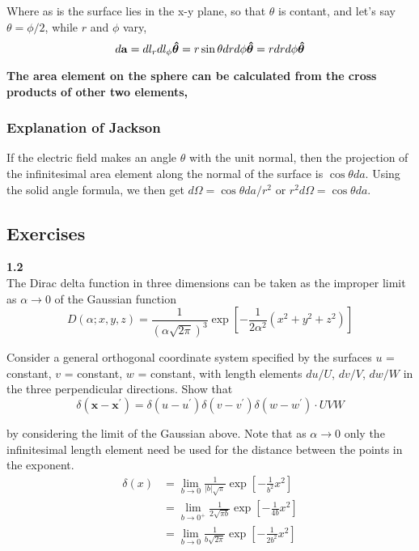 Where as is the surface lies in the x-y plane, so that $\theta$ is contant, and let's say $\theta = \phi/2$,
while $r$ and $\phi$ vary,
$$
d\boldsymbol{\mathbf{a}} = dl_r dl_\phi \boldsymbol{\mathbf{\hat{\theta}}}
= r \sin\theta dr d\phi \boldsymbol{\mathbf{\hat{\theta}}}
= r dr d\phi \boldsymbol{\mathbf{\hat{\theta}}}
$$

\textbf{The area element on the sphere can be calculated from the cross products of other two elements,}


\subsubsection{Explanation of Jackson}

If the electric field makes an angle $\theta$ with the unit normal, then the projection of the
infinitesimal area element along the normal of the surface is $\cos\theta da$.
Using the solid angle formula, we then get $d\Omega = \cos\theta da / r^2$ or
$r^2 d\Omega = \cos\theta da$.



\subsection{Exercises}

\textbf{1.2}
\\

The Dirac delta function in three dimensions can be taken as the improper limit as $\alpha \rightarrow 0$ of the
Gaussian function
$$
D\left(\alpha ; x, y, z \right) =
    \frac{1}{\left(\alpha \sqrt{2\pi}\right)^3}
    \exp{ \left[ -\frac{1}{2\alpha^2} \left( x^2 + y^2 + z^2 \right) \right] }
$$

Consider a general orthogonal coordinate system specified by the surfaces $u$ = constant, $v$ = constant,
$w$ = constant, with length elements $du/U$, $dv/V$, $dw/W$ in the three perpendicular directions.
Show that
$$
\delta\left( \mathbf{x} - \mathbf{x}^\prime \right) =
    \delta\left(u - u^\prime\right) \delta\left(v - v^\prime\right) \delta\left(w - w^\prime\right) \cdot UVW
$$

by considering the limit of the Gaussian above.
Note that as $\alpha \rightarrow 0$ only the infinitesimal length
element need be used for the distance between the points in the exponent.
\\

\begin{align*}
\delta (x) &= \lim_{b\rightarrow 0} \frac{1}{|b|\sqrt{\pi}} \exp{ \left[ -\frac{1}{b^2} x^2 \right]} \\
    &= \lim_{b\rightarrow 0^+} \frac{1}{2\sqrt{\pi b}} \exp{ \left[ -\frac{1}{4b} x^2 \right]} \\
    &= \lim_{b\rightarrow 0} \frac{1}{b \sqrt{2\pi}} \exp{ \left[ -\frac{1}{2b^2} x^2 \right]}
\end{align*}